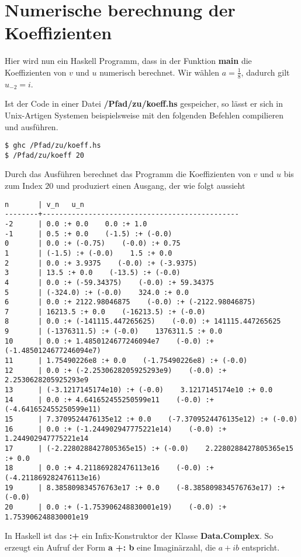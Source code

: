 \chapter{Numerische berechnung der Koeffizienten}
Hier wird nun ein Haskell Programm, dass in der Funktion \textbf{main} die
Koeffizienten von $v$ und $u$ numerisch berechnet. Wir wählen $a=\frac{1}{8}$,
dadurch gilt $u_{-2}=i$.


Ist der Code in einer Datei \textbf{/Pfad/zu/koeff.hs} gespeicher, so lässt er
sich in Unix-Artigen Systemen beispielsweise mit den folgenden Befehlen
compilieren und ausführen.
\begin{lstlisting}[style=Bash]
$ ghc /Pfad/zu/koeff.hs
$ /Pfad/zu/koeff 20
\end{lstlisting}
Durch das Ausführen berechnet das Programm die Koeffizienten von $v$ und $u$
bis zum Index $20$ und produziert einen Ausgang, der wie folgt aussieht
\begin{lstlisting}[style=Bash]
n       | v_n   u_n
--------+-----------------------------------------------
-2      | 0.0 :+ 0.0    0.0 :+ 1.0
-1      | 0.5 :+ 0.0    (-1.5) :+ (-0.0)
0       | 0.0 :+ (-0.75)    (-0.0) :+ 0.75
1       | (-1.5) :+ (-0.0)    1.5 :+ 0.0
2       | 0.0 :+ 3.9375    (-0.0) :+ (-3.9375)
3       | 13.5 :+ 0.0    (-13.5) :+ (-0.0)
4       | 0.0 :+ (-59.34375)    (-0.0) :+ 59.34375
5       | (-324.0) :+ (-0.0)    324.0 :+ 0.0
6       | 0.0 :+ 2122.98046875    (-0.0) :+ (-2122.98046875)
7       | 16213.5 :+ 0.0    (-16213.5) :+ (-0.0)
8       | 0.0 :+ (-141115.447265625)    (-0.0) :+ 141115.447265625
9       | (-1376311.5) :+ (-0.0)    1376311.5 :+ 0.0
10      | 0.0 :+ 1.4850124677246094e7    (-0.0) :+ (-1.4850124677246094e7)
11      | 1.75490226e8 :+ 0.0    (-1.75490226e8) :+ (-0.0)
12      | 0.0 :+ (-2.2530628205925293e9)    (-0.0) :+ 2.2530628205925293e9
13      | (-3.1217145174e10) :+ (-0.0)    3.1217145174e10 :+ 0.0
14      | 0.0 :+ 4.641652455250599e11    (-0.0) :+ (-4.641652455250599e11)
15      | 7.3709524476135e12 :+ 0.0    (-7.3709524476135e12) :+ (-0.0)
16      | 0.0 :+ (-1.244902947775221e14)    (-0.0) :+ 1.244902947775221e14
17      | (-2.2280288427805365e15) :+ (-0.0)    2.2280288427805365e15 :+ 0.0
18      | 0.0 :+ 4.211869282476113e16    (-0.0) :+ (-4.211869282476113e16)
19      | 8.385809834576763e17 :+ 0.0    (-8.385809834576763e17) :+ (-0.0)
20      | 0.0 :+ (-1.753906248830001e19)    (-0.0) :+ 1.753906248830001e19
\end{lstlisting}
In Haskell ist das \textbf{:+} ein Infix-Konstruktor der Klasse
\textbf{Data.Complex}. So erzeugt ein Aufruf der Form \textbf{a +: b} eine
Imaginärzahl, die $a+ib$ entspricht.

